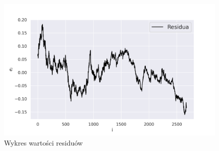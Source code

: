 \documentclass[fleqn]{article}
\begin{document}
    \newpage

    \begin{figure}[H]
        \includegraphics[width=\textwidth]{residua.png}
        \centering
        \caption{Wykres wartości residuów}
        \label{3}
    \end{figure}
\end{document}
